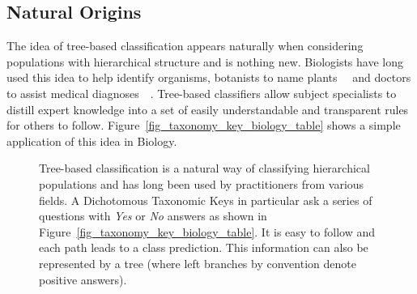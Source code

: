 \subsection{Natural Origins}
\label{NaturalOrigins}
The idea of tree-based classification appears naturally when considering populations with hierarchical structure and is nothing new. Biologists have long used this idea to help identify organisms, botanists to name plants~\cite{nla.cat-vn178734}~\cite{nla.cat-vn2380672} and doctors to assist medical diagnoses~\cite{609112}~\cite{AnneB.Nattinger04011998}. Tree-based classifiers allow subject specialists to distill expert knowledge into a set of easily understandable and transparent rules for others to follow. Figure~\ref{fig_taxonomy_key_biology_table} shows a simple application of this idea in Biology.
\begin{figure}
\centering
{}
\caption{Tree-based classification is a natural way of classifying hierarchical populations and has long been used by practitioners from various fields. A Dichotomous Taxonomic Keys in particular ask a series of questions with \emph{Yes} or \emph{No} answers as shown in Figure~\ref{fig_taxonomy_key_biology_table}. It is easy to follow and each path leads to a class prediction. This information can also be represented by a tree (where left branches by convention denote positive answers).}
\label{fig_taxonomy_key_biology}
\end{figure}
